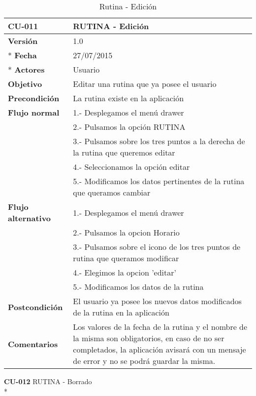 \documentclass[../pfc.tex]{subfiles}
\begin{document}
		\begin{table}[H]
			\centering
			\begin{tabular}[t]{|p{3cm}|p{9.5cm}|}
				\hline \textbf{CU-011} & \textbf{RUTINA - Edición} \\*
				\hline\hline \textbf{Versión} & 1.0 \\ *
				\hline\hline \textbf{Fecha} & 27/07/2015 \\ *
				\hline\textbf{Actores} 	& Usuario\\*
				\hline \textbf{Objetivo} & Editar una rutina que ya posee el usuario\\* 			
				\hline \textbf{Precondición} & La rutina existe en la aplicación\\* 
				\hline \textbf{Flujo normal} & 1.- Desplegamos el menú drawer \\* 
				& 2.- Pulsamos la opción RUTINA\\*	
				& 3.- Pulsamos sobre los tres puntos a la derecha de la rutina que queremos editar\\*	
				& 4.- Seleccionamos la opción editar\\*	
				& 5.- Modificamos los datos pertinentes de la rutina que queramos cambiar\\*	
				\hline \textbf{Flujo alternativo} & 1.- Desplegamos el menú drawer \\* 
				& 2.- Pulsamos la opcion Horario \\*	
				& 3.- Pulsamos sobre el icono de los tres puntos de rutina que queramos modificar \\*	
				& 4.- Elegimos la opcion 'editar'\\*	
				& 5.- Modificamos los datos de la rutina\\*	
				\hline \textbf{Postcondición} & El usuario ya posee los nuevos datos modificados de la rutina en la aplicación \\* 
				\hline \textbf{Comentarios}   & Los valores de la fecha de la rutina y el nombre de la misma son obligatorios, en caso de no ser completados, la aplicación avisará con un mensaje de error y no se podrá guardar la misma.\\*
				\hline
			\end{tabular}
			\caption{Rutina - Edición}
			\label{tabla:caso011}
		\end{table}
		
	\textbf{CU-012}	RUTINA - Borrado\\*
		
\end{document}
